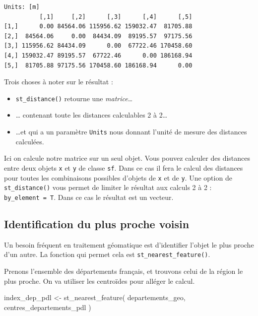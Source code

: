 \documentclass[
]{book}
\newenvironment{Shaded}{\begin{snugshade}}{\end{snugshade}}
\newcommand{\FunctionTok}[1]{\textcolor[rgb]{0.00,0.00,0.00}{#1}}
\newcommand{\NormalTok}[1]{#1}
\newcommand{\OtherTok}[1]{\textcolor[rgb]{0.56,0.35,0.01}{#1}}
\begin{document}
\begin{verbatim}
Units: [m]
          [,1]     [,2]      [,3]      [,4]      [,5]
[1,]      0.00 84564.06 115956.62 159032.47  81705.88
[2,]  84564.06     0.00  84434.09  89195.57  97175.56
[3,] 115956.62 84434.09      0.00  67722.46 170458.60
[4,] 159032.47 89195.57  67722.46      0.00 186168.94
[5,]  81705.88 97175.56 170458.60 186168.94      0.00
\end{verbatim}

Trois choses à noter sur le résultat :

\begin{itemize}
\item
  \texttt{st\_distance()} retourne une \emph{matrice}\ldots{}
\item
  \ldots{} contenant toute les distances calculables 2 à 2\ldots{}
\item
  \ldots et qui a un paramètre \texttt{Units} nous donnant l'unité de mesure des distances calculées.
\end{itemize}

Ici on calcule notre matrice sur un seul objet. Vous pouvez calculer des distances entre deux objets \texttt{x} et \texttt{y} de classe \texttt{sf}. Dans ce cas il fera le calcul des distances pour toutes les combinaisons possibles d'objets de \texttt{x} et de \texttt{y}. Une option de \texttt{st\_distance()} vous permet de limiter le résultat aux calculs 2 à 2 : \texttt{by\_element\ =\ T}. Dans ce cas le résultat est un vecteur.

\hypertarget{identification-du-plus-proche-voisin}{%
\subsection{Identification du plus proche voisin}\label{identification-du-plus-proche-voisin}}

Un besoin fréquent en traitement géomatique est d'identifier l'objet le plus proche d'un autre.
La fonction qui permet cela est \texttt{st\_nearest\_feature()}.

Prenons l'ensemble des départements français, et trouvons celui de la région le plus proche. On va utiliser les centroïdes pour alléger le calcul.

\begin{Shaded}
\begin{Highlighting}[]
\NormalTok{index\_dep\_pdl }\OtherTok{\textless{}{-}} \FunctionTok{st\_nearest\_feature}\NormalTok{(}
\NormalTok{  departements\_geo,}
\NormalTok{  centres\_departements\_pdl}
\NormalTok{)}
\end{Highlighting}
\end{Shaded}
\end{document}
